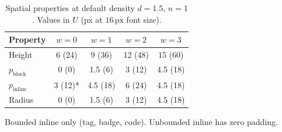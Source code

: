 \begin{table}[ht]
\centering
\caption{Spatial properties at default density $d = 1.5$, $n = 1$. Values in $U$ (px at $16\,\text{px}$ font size).}
\label{tab:spacing-reference}
\begin{tabular}{lcccc}
\toprule
Property & $w = 0$ & $w = 1$ & $w = 2$ & $w = 3$ \\
\midrule
Height        & 6 (24)   & 9 (36)   & 12 (48)  & 15 (60)  \\
$p_{\text{block}}$   & 0 (0)    & 1.5 (6)  & 3 (12)   & 4.5 (18) \\
$p_{\text{inline}}$  & 3 (12)*  & 4.5 (18) & 6 (24)   & 4.5 (18) \\
Radius        & 0 (0)    & 1.5 (6)  & 3 (12)   & 4.5 (18) \\
\bottomrule
\end{tabular}

\vspace{0.5em}
\footnotesize * Bounded inline only (tag, badge, code). Unbounded inline has zero padding.
\end{table}
